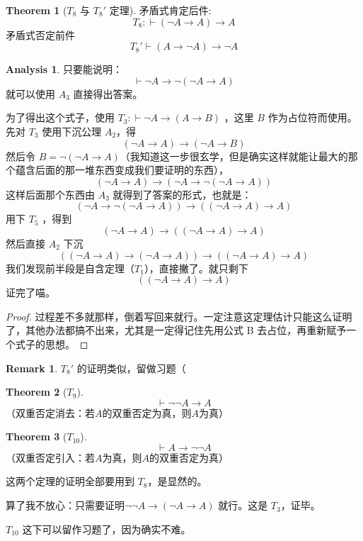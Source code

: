 \documentclass[oneside]{book}
\theoremstyle{definition}
\newtheorem{theorem}{Theorem}[section]
\newtheorem{remark}{Remark}[section]
\newtheorem*{analysis}{Analysis}
\begin{document}
\begin{theorem}[$T_8$ 与 $T_8'$ 定理]
	矛盾式肯定后件:\[
	T_8:\vdash (\neg A \to A) \to A
	\]
	矛盾式否定前件
	\[
	T_8'\vdash (A \to \neg A) \to \neg A
	\]
\end{theorem}

\begin{analysis}
	只要能说明：
	\[
	\vdash \neg A \to \neg (\neg A \to A)
	\]
	就可以使用 \(A_3\) 直接得出答案。
	
	为了得出这个式子，使用 \(T_3:\vdash \neg A \to (A \to B)\) ，这里 \(B\) 作为占位符而使用。
	先对 \(T_3\) 使用下沉公理 \(A_2\)，得
	\[
	(\neg A \to A) \to \left( \neg A \to  B\right)
	\]
然后令 \(B=\neg (\neg A \to A)\)（我知道这一步很玄学，但是确实这样就能让最大的那个蕴含后面的那一堆东西变成我们要证明的东西），
	\[
	(\neg A \to A) \to \left( \neg A \to  \neg (\neg A \to A) \right)
	\]
这样后面那个东西由 \(A_3\) 就得到了答案的形式，也就是：
\[\left( \neg A \to  \neg (\neg A \to A) \right)\to((\neg A \to A)\to A)\]
用下 \(T_5\) ，得到
\[
(\neg A \to A) \to ((\neg A \to A)\to A)
\]
然后直接 \(A_2\) 下沉
	\[
	\left( (\neg A \to A) \to (\neg A \to A) \right) \to \left( (\neg A \to A) \to A \right)
	\]
	我们发现前半段是自含定理（\(T_1\)），直接撇了。就只剩下 \[\left( (\neg A \to A) \to A \right)\]
	证完了喵。
\end{analysis}

\begin{proof}
	过程差不多就那样，倒着写回来就行。一定注意这定理估计只能这么证明了，其他办法都搞不出来，尤其是一定得记住先用公式 B 去占位，再重新赋予一个式子的思想。
\end{proof}
\begin{remark}
	\(T_8'\) 的证明类似，留做习题（
\end{remark}


\begin{theorem}[\(T_9\)]
	\[
	\vdash \neg \neg A \to A
	\]
	（双重否定消去：若$A$的双重否定为真，则$A$为真）
\end{theorem}


\begin{theorem}[\(T_{10}\)]
	\[
	\vdash A \to \neg \neg A
	\]
	（双重否定引入：若$A$为真，则$A$的双重否定为真）
\end{theorem}
这两个定理的证明全部要用到 \(T_8\)，是显然的。

算了我不放心：只需要证明\(\neg\neg A\to (\neg A\to A)\) 就行。这是 \(T_3\)，证毕。

\(T_{10}\) 这下可以留作习题了，因为确实不难。
\end{document}
